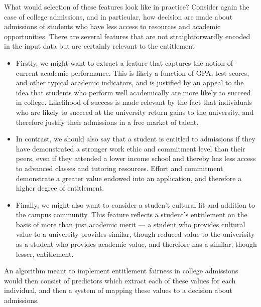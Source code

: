 What would selection of these features look like in practice? Consider again the case of
college admissions, and in particular, how decision are made about admissions of
students who have less access to resources and academic opportunities. There are
several features that are not straightforwardly encoded in the input data but
are certainly relevant to the entitlement
\begin{itemize}
    \item Firstly, we might want to extract a feature that captures the notion
    of current academic performance. This is likely a function of GPA, test
    scores, and other typical academic indicators, and is justified by an appeal
    to the idea that students who perform well academically are more likely to
    succeed in college. Likelihood of success is made relevant by the fact
    that individuals who are likely to succeed at the university return gains 
    to the university, and therefore justify their admissions in a free market
    of talent.
    \item In contrast, we should also say that a student is entitled to admissions if
    they have demonstrated a stronger work ethic and commitment level than their
    peers, even if they attended a lower income school and thereby has less 
    access to advanced classes and tutoring resources. Effort and commitment
    demonstrate a greater value endowed into an application, and therefore a
    higher degree of entitlement.
    \item Finally, we might also want to consider a studen't cultural fit and
    addition to the campus community. This feature reflects a student's
    entitlement on the basis of more than just academic merit — a student who
    provides cultural value to a university provides similar, though reduced
    value to the univerisity as a student who provides academic value, and
    therefore has a similar, though lesser, entitlement.
\end{itemize}
An algorithm meant to implement entitlement fairness in college admissions
would then consist of predictors which extract each of these values for each
individual, and then a system of mapping these values to a decision about
admissions. 

